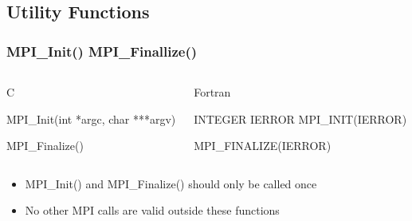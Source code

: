\documentclass[handout]{beamer}
\begin{document}
  \subsection{Utility Functions}
  \begin{frame}[fragile]
  \frametitle{MPI\_Init() MPI\_Finallize()}
   \begin{columns}[T]
    \begin{column}{5cm}
     \begin{block}{C}
      \begin{semiverbatim}
MPI\_Init(int  *argc,
          char ***argv)

MPI\_Finalize()
      \end{semiverbatim}
     \end{block}
    \end{column}
    \begin{column}{5cm}
     \begin{block}{Fortran}
      \begin{semiverbatim}
INTEGER IERROR
MPI\_INIT(IERROR)

MPI\_FINALIZE(IERROR)
      \end{semiverbatim}
     \end{block}
    \end{column}
   \end{columns}
   \begin{itemize}
     \item<2-> MPI\_Init() and MPI\_Finalize() should only be called once
     \item<3-> No other MPI calls are valid outside these functions
   \end{itemize}
\end{frame}
\end{document}
